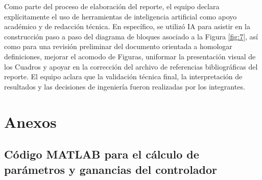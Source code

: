 \documentclass{article}
\begin{document}
Como parte del proceso de elaboración del reporte, el equipo declara explícitamente el uso de herramientas de inteligencia artificial como apoyo académico y de redacción técnica. En específico, se utilizó IA para asistir en la construcción paso a paso del diagrama de bloques asociado a la Figura \ref{fig:7}, así como para una revisión preliminar del documento orientada a homologar definiciones, mejorar el acomodo de Figuras, uniformar la presentación visual de los Cuadros y apoyar en la corrección del archivo de referencias bibliográficas del reporte. El equipo aclara que la validación técnica final, la interpretación de resultados y las decisiones de ingeniería fueron realizadas por los integrantes.

\vspace{10 mm}

\newpage
\section{Anexos}

\subsection{Código MATLAB para el cálculo de parámetros y ganancias del controlador}\label{anexo:matlab_ganancias}
\end{document}
